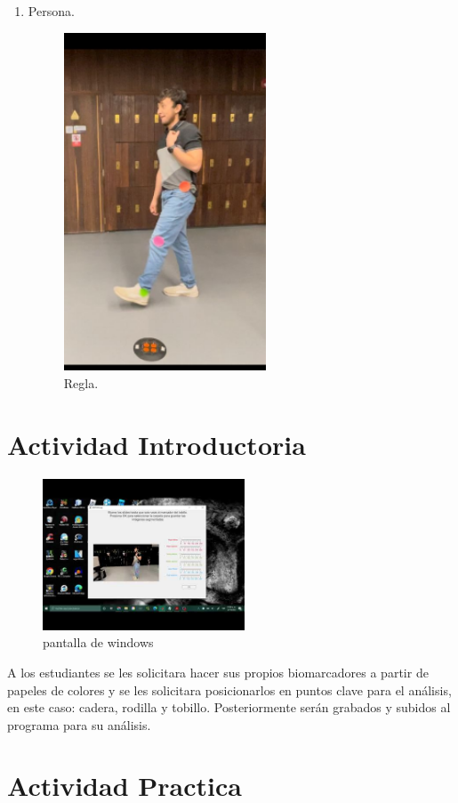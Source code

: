\documentclass[journal,transmag]{IEEEtran}
\begin{document}
\begin{enumerate}
 \item Persona.
				 \begin{figure}[!h]
			\center
			\includegraphics[width=6cm]{persona.png}
			\caption{Regla.}
			\label{4}
			\end{figure}


	\end{enumerate}


\section{Actividad Introductoria}
\begin{figure}[!h]
			\center
			\includegraphics[width=6cm]{pantalla.jpg}
			\caption{pantalla de windows}
			\label{4}
			\end{figure}


	A los estudiantes se les solicitara hacer sus propios biomarcadores a partir de papeles de colores y se les solicitara posicionarlos en puntos clave para el análisis, en este caso: cadera, rodilla y tobillo. Posteriormente serán grabados y subidos al programa para su análisis.
	
   \section{Actividad Practica }
 
\end{document}
